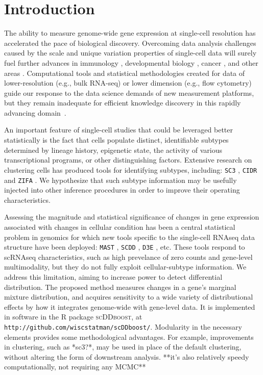 \documentclass[aoas,preprint]{imsart}
\begin{document}
\begin{frontmatter}
\end{frontmatter}

\section{Introduction}

The ability to measure genome-wide gene expression at single-cell resolution 
has accelerated the pace of biological discovery.  Overcoming data
analysis challenges caused by the scale and unique variation properties of single-cell
data will surely fuel further advances in immunology \citep{immune}, developmental
biology \citep{dv}, cancer \citep{cancer}, and other areas \citep{scs}. 
 Computational tools and statistical methodologies 
created for data of lower-resolution (e.g., bulk RNA-seq) or lower dimension 
(e.g., flow cytometry)  guide our response to 
 the data science demands of new measurement platforms,
but they remain inadequate for efficient knowledge discovery in this
rapidly advancing domain~\citep{Bacher2016}.

An important feature of single-cell studies that could be leveraged better
statistically is the fact that cells populate distinct, identifiable subtypes
determined by lineage history, epigenetic state, the activity
of various transcriptional programs, or other 
distinguishing factors. Extensive research on clustering cells
has produced tools for identifying subtypes, including: 
 \verb+SC3+ \citep{sc3}, \verb+CIDR+ \citep{CIDR} and \verb+ZIFA+ \citep{ZIFA}.
We hypothesize that such
subtype information may be usefully injected into other inference procedures in order
to improve their operating characteristics. 

Assessing the magnitude and statistical significance of changes in gene
expression associated with changes in cellular condition has been a central
statistical problem in genomics for which new tools specific to
the single-cell RNAseq data structure have been deployed: \verb+MAST+ \citep{ref:MAST},
\verb+SCDD+ \citep{ref:scDD}, \verb+D3E+ \citep{ref:d3e}, etc.  These tools respond
to scRNAseq characteristics, such as high prevelance of zero counts and
gene-level multimodality, but they do not fully exploit cellular-subtype
information.  We address this limitation, aiming to increase power to detect differential distribution.
The proposed method measures changes in a gene's marginal mixture distribution, and
acquires sensitivity  to a wide variety of distributional effects by how it integrates genome-wide with
gene-level data.  It is implemented in  software 
in the R package \textsc{scDDboost}, at \verb+http://github.com/wiscstatman/scDDboost/+.
Modularity in the necessary elements provides some methodological advantages. For example,
improvements in clustering, such as *sc3?*, may be used in place of the default clustering,
without altering the form of downstream analysis. **it's also relatively speedy computationally,
not requiring any MCMC**
\end{document}
